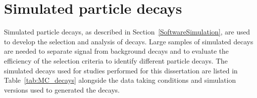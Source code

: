 \section{Simulated particle decays}
\label{sec:MCsamples}
Simulated particle decays, as described in Section~\ref{SoftwareSimulation}, are used to develop the selection and analysis of \bmumu decays. Large samples of simulated decays are needed to separate signal from background decays and to evaluate the efficiency of the selection criteria to identify different particle decays. 
The simulated decays used for studies performed for this dissertation are listed in Table~\ref{tab:MC_decays} alongside the data taking conditions and simulation versions used to generated the decays.


